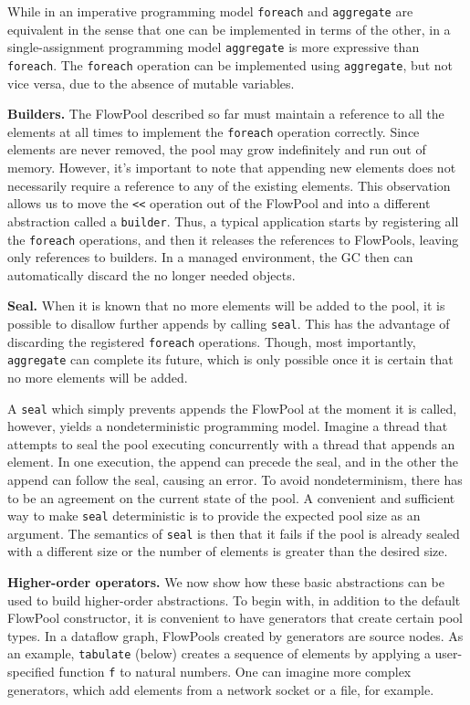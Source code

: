 \documentclass[runningheads,a4paper]{llncs}
\begin{document}
While in an imperative programming model \verb=foreach= and \verb=aggregate= are
equivalent in the sense that one can be implemented in terms of the
other, in a single-assignment programming model \verb=aggregate= is more
expressive than \verb=foreach=.
The \verb=foreach= operation can be implemented using \verb=aggregate=, but not vice versa,
due to the absence of mutable variables.

\textbf{Builders.}
The FlowPool described so far must maintain a reference  to all the elements
at all times to implement the \verb=foreach= operation correctly. Since
elements are never removed, the pool may grow indefinitely and run out of
memory. However, it's important to note that appending new elements does not
necessarily require a reference to any of the existing elements. This
observation allows us to move the \verb=<<= operation out of the FlowPool and
into a different abstraction called a \verb=builder=. Thus, a typical
application starts by registering all the \verb=foreach= operations, and then
it releases the references to FlowPools, leaving only references to builders.
In a managed environment, the GC then can automatically discard the no longer
needed objects.


\textbf{Seal.}
When it is known that no more elements will be added to the pool,
it is possible to disallow further appends by calling \verb=seal=.
This has the advantage of discarding the registered \verb=foreach=
operations.
Though, most importantly, \verb=aggregate= can complete its future, which is only possible
once it is certain that no more elements will be added.

A \verb=seal= which simply prevents appends the FlowPool at the moment it
is called, however, yields a nondeterministic programming model.
Imagine a thread that attempts to seal the pool executing concurrently
with a thread that appends an element.
In one execution, the append can precede the seal, and in the other
the append can follow the seal, causing an error.
To avoid nondeterminism, there has to be an agreement on the
current state of the pool.
A convenient and sufficient way to make \verb=seal= deterministic
is to provide the expected pool size as an argument.
The semantics of \verb=seal= is then that it fails if the pool
is already sealed with a different size or the number of elements
is greater than the desired size.

\textbf{Higher-order operators.}
We now show how these basic abstractions can be used
to build higher-order abstractions.
To begin with, in addition to the default FlowPool constructor, it is
convenient to have generators that create certain pool types.
In a dataflow graph, FlowPools created by generators
are source nodes.
As an example, \verb=tabulate= (below) creates a sequence of elements
by applying a user-specified function \verb=f= to natural numbers.
One can imagine more complex generators, which add elements from a
network socket or a file, for example.
\end{document}
